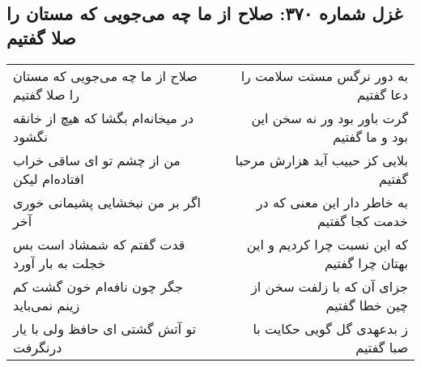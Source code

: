 \begin{center}
\section*{غزل شماره ۳۷۰: صلاح از ما چه می‌جویی که مستان را صلا گفتیم}
\label{sec:sh370}
\begin{longtable}{l p{0.5cm} r}
صلاح از ما چه می‌جویی که مستان را صلا گفتیم
&&
به دور نرگس مستت سلامت را دعا گفتیم
\\
در میخانه‌ام بگشا که هیچ از خانقه نگشود
&&
گرت باور بود ور نه سخن این بود و ما گفتیم
\\
من از چشم تو ای ساقی خراب افتاده‌ام لیکن
&&
بلایی کز حبیب آید هزارش مرحبا گفتیم
\\
اگر بر من نبخشایی پشیمانی خوری آخر
&&
به خاطر دار این معنی که در خدمت کجا گفتیم
\\
قدت گفتم که شمشاد است بس خجلت به بار آورد
&&
که این نسبت چرا کردیم و این بهتان چرا گفتیم
\\
جگر چون نافه‌ام خون گشت کم زینم نمی‌باید
&&
جزای آن که با زلفت سخن از چین خطا گفتیم
\\
تو آتش گشتی ای حافظ ولی با یار درنگرفت
&&
ز بدعهدی گل گویی حکایت با صبا گفتیم
\\
\end{longtable}
\end{center}
